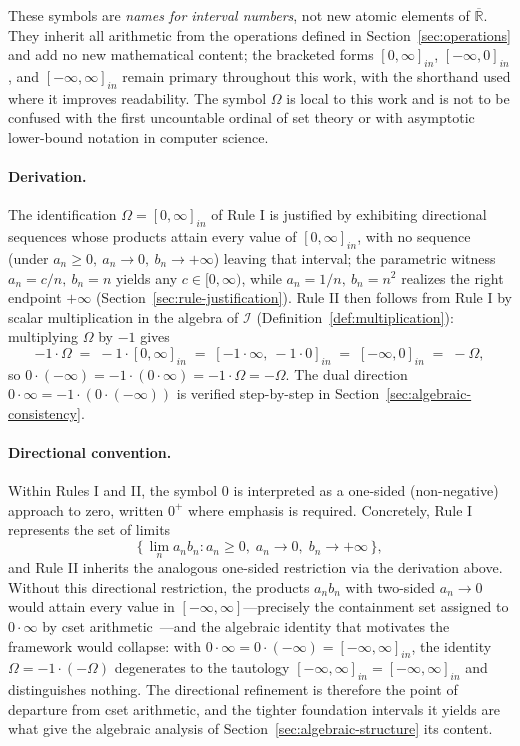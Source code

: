 \documentclass[11pt,a4paper]{article}
\theoremstyle{paperdef}
\newcommand{\Rext}{\overline{\mathbb{R}}}
\newcommand{\Iset}{\mathcal{I}}
\newcommand{\inI}[1]{[#1]_{in}}
\begin{document}
These symbols are \emph{names for interval numbers}, not new atomic
elements of $\Rext$. They inherit all arithmetic from the operations
defined in Section~\ref{sec:operations} and add no new mathematical
content; the bracketed forms $\inI{0, \infty}$, $\inI{-\infty, 0}$,
and $\inI{-\infty, \infty}$ remain primary throughout this work, with
the shorthand used where it improves readability. The symbol $\Omega$
is local to this work and is not to be confused with the first
uncountable ordinal of set theory or with asymptotic lower-bound
notation in computer science.

\paragraph{Derivation.} The identification $\Omega = \inI{0, \infty}$
of Rule I is justified by exhibiting directional sequences whose
products attain every value of $\inI{0, \infty}$, with no sequence
(under $a_n \ge 0,\ a_n \to 0,\ b_n \to +\infty$) leaving that
interval; the parametric witness $a_n = c/n,\ b_n = n$ yields any
$c \in [0, \infty)$, while $a_n = 1/n,\ b_n = n^2$ realizes the right
endpoint $+\infty$ (Section~\ref{sec:rule-justification}). Rule II
then follows from Rule I by scalar multiplication in the algebra of
$\Iset$ (Definition~\ref{def:multiplication}): multiplying $\Omega$
by $-1$ gives
\[
-1 \cdot \Omega \;=\; -1 \cdot \inI{0, \infty}
\;=\; \inI{-1 \cdot \infty,\ -1 \cdot 0}
\;=\; \inI{-\infty, 0} \;=\; -\Omega,
\]
so
$0 \cdot (-\infty) = -1 \cdot (0 \cdot \infty) = -1 \cdot \Omega = -\Omega$.
The dual direction $0 \cdot \infty = -1 \cdot (0 \cdot (-\infty))$ is
verified step-by-step in Section~\ref{sec:algebraic-consistency}.

\paragraph{Directional convention.} Within Rules I and II, the symbol
$0$ is interpreted as a one-sided (non-negative) approach to zero,
written $0^{+}$ where emphasis is required. Concretely, Rule I
represents the set of limits
\[
\{\, \lim_{n} a_n b_n : a_n \ge 0,\; a_n \to 0,\; b_n \to +\infty \,\},
\]
and Rule II inherits the analogous one-sided restriction via the
derivation above. Without this directional restriction, the products
$a_n b_n$ with two-sided $a_n \to 0$ would attain every value in
$[-\infty, \infty]$---precisely the containment set assigned to
$0 \cdot \infty$ by cset
arithmetic~\cite{Walster1998,PryceCorliss2006}---and the algebraic
identity that motivates the framework would collapse: with
$0 \cdot \infty = 0 \cdot (-\infty) = \inI{-\infty, \infty}$, the
identity $\Omega = -1 \cdot (-\Omega)$ degenerates to the tautology
$\inI{-\infty, \infty} = \inI{-\infty, \infty}$ and distinguishes
nothing. The directional refinement is therefore the point of
departure from cset arithmetic, and the tighter foundation intervals
it yields are what give the algebraic analysis of
Section~\ref{sec:algebraic-structure} its content.
\end{document}

